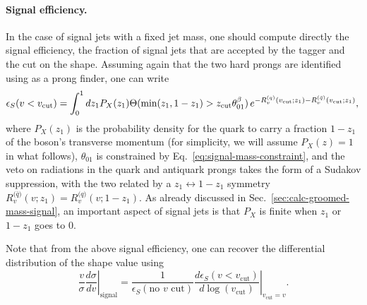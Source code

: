 \paragraph{Signal efficiency.}
%
In the case of signal jets with a fixed jet mass, one should compute
directly the signal efficiency, \ie the fraction of signal jets that
are accepted by the tagger and the cut on the shape.
%
Assuming again that the two hard prongs are identified using \SD as a
prong finder, one can write
%
\begin{equation}
  \epsilon_S(v<v_\text{cut}) = \int_0^1 dz_1 P_X(z_1)
  \Theta(\text{min}(z_1,1-z_1)>z_{\text{cut}}\theta_{01}^\beta)
  \,e^{-R_v^\text{($q$)}(v_\text{cut};z_1)-R_v^\text{($\bar q$)}(v_\text{cut};z_1)},\label{eq:signal-eff-basic}\\
\end{equation}
where $P_X(z_1)$ is the probability density for the quark to carry a
fraction $1-z_1$ of the boson's transverse momentum (for simplicity,
we will assume $P_X(z)=1$ in what follows), $\theta_{01}$ is
constrained by Eq.~\eqref{eq:signal-mass-constraint}, and the veto on
radiations in the quark and antiquark prongs takes the form of a
Sudakov suppression, with the two related by a
$z_1\leftrightarrow 1-z_1$ symmetry
$R_v^\text{($\bar q$)}(v;z_1)=R_v^\text{($q$)}(v;1-z_1)$.
%
As already discussed in Sec.~\ref{sec:calc-groomed-mass-signal}, an
important aspect of signal jets is that $P_X$ is finite when $z_1$ or
$1-z_1$ goes to 0.

Note that from the above signal efficiency, one can recover the
differential distribution of the shape value using
\begin{equation}
  \left. \frac{v}{\sigma}\frac{d\sigma}{dv}\right|_\text{signal}
  = \frac{1}{\epsilon_S(\text{no $v$ cut})}
  \left.\frac{d\epsilon_S(v<v_\text{cut})}{d\log(v_{\text{cut}})}\right|_{v_\text{cut}=v}.
\end{equation}

